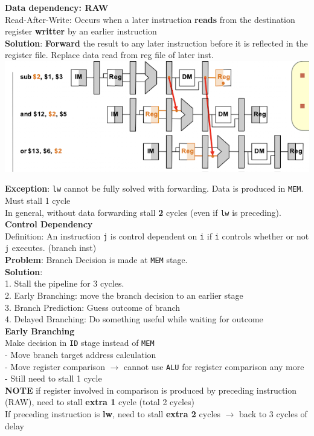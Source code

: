 \documentclass[10pt, a4paper]{article}
\newcommand{\highlight}[1]{{\color{red}\textbf{#1}}}
\begin{document}
\begin{multicols*}{3}
		\textbf{Data dependency: RAW}\\
		Read-After-Write: Occurs when a later instruction \highlight{reads} from the destination register \highlight{writter} by an earlier instruction\\
		\highlight{Solution}: \highlight{Forward} the result to any later instruction before it is reflected in the register file. Replace data read from reg file of later inst.\\
		\includegraphics[scale=.7]{./assets/dataForwarding}
		
		\highlight{Exception}: \texttt{lw} cannot be fully solved with forwarding. Data is produced in \texttt{MEM}. Must stall 1 cycle\\
		In general, without data forwarding stall \highlight{2} cycles (even if \texttt{lw} is preceding).\\

		\textbf{Control Dependency}\\
		Definition: An instruction \texttt{j} is control dependent on \texttt{i} if \texttt{i} controls whether or not \texttt{j} executes. (branch inst)\\
		
		\highlight{Problem}: Branch Decision is made at \texttt{MEM} stage.\\
		\highlight{Solution}: \\
		1. Stall the pipeline for 3 cycles.\\
		2. Early Branching: move the branch decision to an earlier stage\\
		3. Branch Prediction: Guess outcome of branch\\
		4. Delayed Branching: Do something useful while waiting for outcome\\
		
		\textbf{Early Branching}\\
		Make decision in \texttt{ID} stage instead of \texttt{MEM}\\
		- Move branch target address calculation\\
		- Move register comparison $\rightarrow$ cannot use \texttt{ALU} for register comparison any more\\
		- Still need to stall 1 cycle\\
		\highlight{NOTE} if register involved in comparison is produced by preceding instruction (RAW), need to stall \highlight{extra 1} cycle (total 2 cycles)\\
		If preceding instruction is \highlight{lw}, need to stall \highlight{extra 2} cycles $\rightarrow$ back to 3 cycles of delay\\
		

\end{multicols*}
\end{document}
